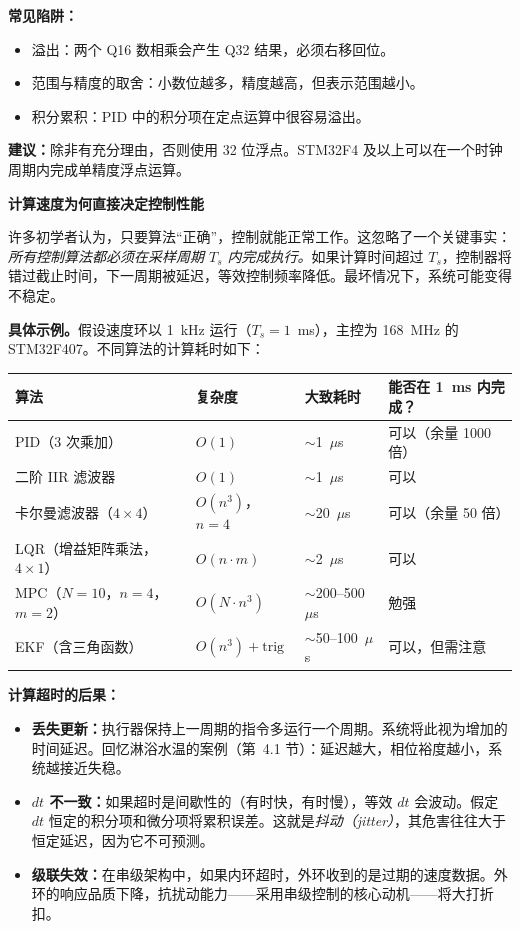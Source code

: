 \textbf{常见陷阱：}
\begin{itemize}
    \item 溢出：两个 Q16 数相乘会产生 Q32 结果，必须右移回位。
    \item 范围与精度的取舍：小数位越多，精度越高，但表示范围越小。
    \item 积分累积：PID 中的积分项在定点运算中很容易溢出。
\end{itemize}

\textbf{建议：}除非有充分理由，否则使用 32 位浮点。STM32F4 及以上可以在一个时钟周期内完成单精度浮点运算。

\vspace{0.5em}
\begin{mdframed}[linewidth=1pt, innertopmargin=10pt, innerbottommargin=10pt]
\textbf{计算速度为何直接决定控制性能}

\vspace{0.3em}
许多初学者认为，只要算法``正确''，控制就能正常工作。这忽略了一个关键事实：\textit{所有控制算法都必须在采样周期 $T_s$ 内完成执行。}如果计算时间超过 $T_s$，控制器将错过截止时间，下一周期被延迟，等效控制频率降低。最坏情况下，系统可能变得不稳定。

\textbf{具体示例。}假设速度环以 1~kHz 运行（$T_s = 1$~ms），主控为 168~MHz 的 STM32F407。不同算法的计算耗时如下：

\begin{center}
\begin{tabular}{llll}
\toprule
\textbf{算法} & \textbf{复杂度} & \textbf{大致耗时} & \textbf{能否在 1~ms 内完成？} \\
\midrule
PID（3 次乘加） & $O(1)$ & $\sim$1~$\mu$s & 可以（余量 1000 倍） \\
二阶 IIR 滤波器 & $O(1)$ & $\sim$1~$\mu$s & 可以 \\
卡尔曼滤波器（$4 \times 4$） & $O(n^3)$，$n=4$ & $\sim$20~$\mu$s & 可以（余量 50 倍） \\
LQR（增益矩阵乘法，$4 \times 1$） & $O(n \cdot m)$ & $\sim$2~$\mu$s & 可以 \\
MPC（$N=10$，$n=4$，$m=2$） & $O(N \cdot n^3)$ & $\sim$200--500~$\mu$s & 勉强 \\
EKF（含三角函数） & $O(n^3) + \text{trig}$ & $\sim$50--100~$\mu$s & 可以，但需注意 \\
\bottomrule
\end{tabular}
\end{center}

\textbf{计算超时的后果：}
\begin{itemize}[nosep]
    \item \textbf{丢失更新：}执行器保持上一周期的指令多运行一个周期。系统将此视为增加的时间延迟。回忆淋浴水温的案例（第~4.1 节）：延迟越大，相位裕度越小，系统越接近失稳。
    \item \textbf{$dt$ 不一致：}如果超时是间歇性的（有时快，有时慢），等效 $dt$ 会波动。假定 $dt$ 恒定的积分项和微分项将累积误差。这就是\textit{抖动（jitter）}，其危害往往大于恒定延迟，因为它不可预测。
    \item \textbf{级联失效：}在串级架构中，如果内环超时，外环收到的是过期的速度数据。外环的响应品质下降，抗扰动能力——采用串级控制的核心动机——将大打折扣。
\end{itemize}


\end{mdframed}
